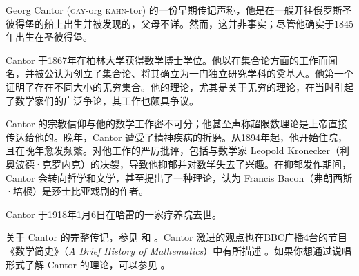 \documentclass[../../../include/open-logic-section]{subfiles}
\begin{document}



Georg Cantor (\textsc{gay}-org \textsc{kahn}-tor) 的一份早期传记声称，他是在一艘开往俄罗斯圣彼得堡的船上出生并被发现的，父母不详。然而，这并非事实；尽管他确实于1845年出生在圣彼得堡。

Cantor 于1867年在柏林大学获得数学博士学位。他以在集合论方面的工作而闻名，并被公认为创立了集合论、将其确立为一门独立研究学科的奠基人。他第一个证明了存在不同大小的无穷集合。他的理论，尤其是关于无穷的理论，在当时引起了数学家们的广泛争论，其工作也颇具争议。

Cantor 的宗教信仰与他的数学工作密不可分；他甚至声称超限数理论是上帝直接传达给他的。晚年，Cantor 遭受了精神疾病的折磨。从1894年起，他开始住院，且在晚年愈发频繁。对他工作的严厉批评，包括与数学家 Leopold Kronecker（利奥波德·克罗内克）的决裂，导致他抑郁并对数学失去了兴趣。在抑郁发作期间，Cantor 会转向哲学和文学，甚至提出了一种理论，认为 Francis Bacon（弗朗西斯·培根）是莎士比亚戏剧的作者。

Cantor 于1918年1月6日在哈雷的一家疗养院去世。

\begin{reading}
关于 Cantor 的完整传记，参见 \citet{Dauben1990} 和 \citet{Grattan-Guinness1971}。Cantor 激进的观点也在BBC广播4台的节目《数学简史》（\emph{A Brief History of Mathematics}）中有所描述 \citep{Sautoy2014}。如果你想通过说唱形式了解 Cantor 的理论，可以参见 \citet{Rose2012}。
\end{reading}
\end{document}
